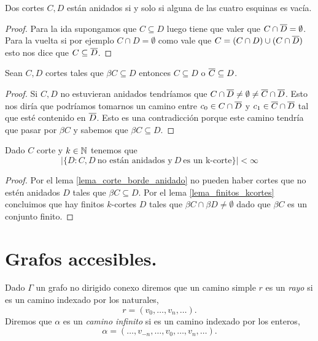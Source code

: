 \documentclass[tesis.tex]{subfiles}
\begin{document}
\begin{lema}
	Dos cortes $C,D$ están anidados si y solo si alguna de las cuatro esquinas es vacía.
\end{lema}
\begin{proof}
	Para la ida supongamos que $C \subseteq D$ luego tiene que valer que $C \cap \overline D = \emptyset$.
	Para la vuelta si por ejemplo $C \cap D = \emptyset$ como vale que $C = (C \cap D) \cup (C \cap \overline D)$ esto nos dice que $C \subseteq \overline D$.
	
\end{proof}

\begin{lema}\label{lema_corte_borde_anidado}
	Sean $C,D$ cortes tales que $\beta C \subseteq D$ entonces $C \subseteq D$ o $\overline C \subseteq D$.
\end{lema}
\begin{proof}
	Si $C,D$ no estuvieran anidados tendríamos que $C \cap \overline D \neq \emptyset \neq \overline C \cap \overline D$.
	Esto nos diría que podríamos tomarnos un camino entre $c_0 \in C \cap \overline D$ y $c_1 \in \overline C \cap \overline D$ tal que esté contenido en $\overline D$.
	Esto es una contradicción porque este camino tendría que pasar por $\beta C$ y sabemos que $\beta C \subseteq D$.
	
\end{proof}


\begin{lema}
	Dado $C$ corte y $k \in \mathbb{N}$ tenemos que 
	\[
	| \{  D : C, D \ \text{no están anidados y} \ D \ \text{es un k-corte}   \} | < \infty
	\]
\end{lema}
\begin{proof}
	Por el lema \ref{lema_corte_borde_anidado} no pueden haber cortes que no estén anidados $D$ tales que $\beta C \subseteq D$.
	Por el lema \ref{lema_finitos_kcortes} concluimos que hay finitos $k$-cortes $D$ tales que $\beta C \cap \beta D \neq \emptyset$ dado que $\beta C$ es un conjunto finito.
				
\end{proof}


\section{Grafos accesibles.}\label{secc_grafos_accesibles}

\begin{deff}
	Dado $\Gamma$ un grafo no dirigido conexo diremos que un camino simple $r$ es un \emph{rayo} si es un camino indexado por los naturales,
	\[
	r = (v_0, \dots, v_{n}, \dots).
	\]	
	Diremos que $\alpha$ es un \emph{camino infinito} si es un camino indexado por los enteros,
	\[
	\alpha = ( \dots, v_{-n}, \dots, v_0, \dots, v_{n}, \dots ).
	\]
\end{deff}		
\end{document}
